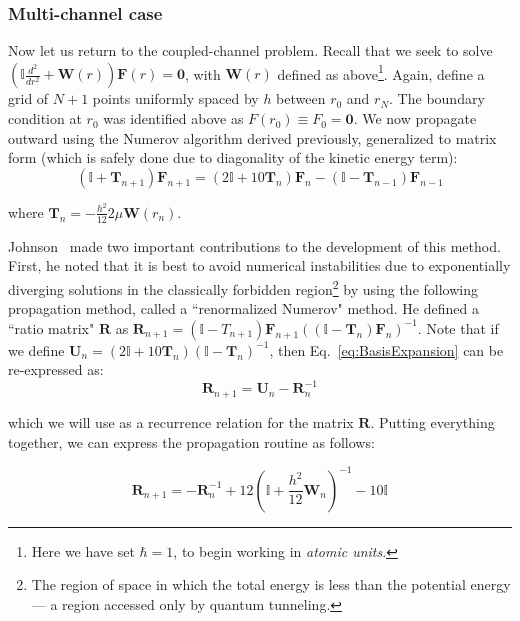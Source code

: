 \documentclass[%
 reprint,
 amsmath,amssymb,
 aps,
 nofootinbib
]{revtex4-1}
\begin{document}
\subsubsection{Multi-channel case}
Now let us return to the coupled-channel problem. Recall that we seek to solve $\left( \mathbb{I} \frac{d^2}{dr^2} + \mathbf{W}(r) \right) \mathbf{F}(r) = \mathbf{0}$, with $\mathbf{W}(r)$ defined as above\footnote{Here we have set $\hbar = 1$, to begin working in \textit{atomic units}.}. Again, define a grid of $N+1$ points uniformly spaced by $h$ between $r_0$ and $r_N$. The boundary condition at $r_0$ was identified above as $F(r_0) \equiv F_0 = \mathbf{0}$. We now propagate outward using the Numerov algorithm derived previously, generalized to matrix form (which is safely done due to diagonality of the kinetic energy term): 
\begin{equation}
\left(\mathbb{I}+\mathbf{T}_{n+1}\right) \mathbf{F}_{n+1} = \left(2\mathbb{I}+10\mathbf{T}_{n} \right)\mathbf{F}_n - \left(\mathbb{I}-\mathbf{T}_{n-1} \right) \mathbf{F}_{n-1}
\label{eq:MatrixNumerov}
\end{equation}

\noindent where $\mathbf{T}_n = -\frac{h^2}{12} 2 \mu \mathbf{W}(r_n)$. 

Johnson~\cite{JohnsonNumerov,Johnson73} made two important contributions to the development of this method. First, he noted that it is best to avoid numerical instabilities due to exponentially diverging solutions in the classically forbidden region\footnote{The region of space in which the total energy is less than the potential energy--- a region accessed only by quantum tunneling.} by using the following propagation method, called a ``renormalized Numerov" method. He defined a ``ratio matrix" $\mathbf{R}$ as $\mathbf{R}_{n+1} = \left( \mathbb{I} - T_{n+1}\right) \mathbf{F}_{n+1} \left((\mathbb{I}-\mathbf{T}_n)\mathbf{F}_n\right)^{-1}$. Note that if we define $\mathbf{U}_n = \left(2\mathbb{I}+10\mathbf{T}_n\right) \left(\mathbb{I}-\mathbf{T}_n\right)^{-1}$, then Eq.~\ref{eq:BasisExpansion} can be re-expressed as:
\begin{equation}
\mathbf{R}_{n+1} = \mathbf{U}_n - \mathbf{R}_n^{-1}
\end{equation}

\noindent which we will use as a recurrence relation for the matrix $\mathbf{R}$. Putting everything together, we can express the propagation routine as follows:

\begin{equation}
\mathbf{R}_{n+1} = -\mathbf{R}_n^{-1} + 12 \left(\mathbb{I} + \frac{h^2}{12} \mathbf{W}_n \right)^{-1} - 10\mathbb{I}
\end{equation}
\end{document}
